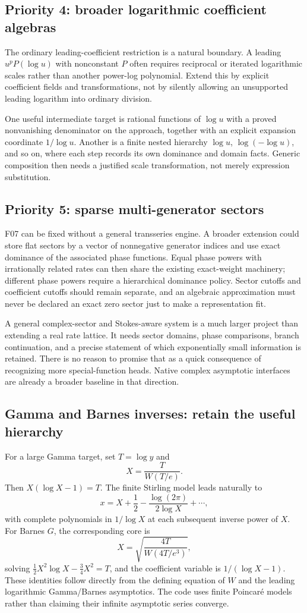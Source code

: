 \documentclass[11pt,letterpaper]{article}
\begin{document}
\subsection{Priority 4: broader logarithmic coefficient algebras}
The ordinary leading-coefficient restriction is a natural boundary. A leading $u^p P(\log u)$ with nonconstant $P$ often requires reciprocal or iterated logarithmic scales rather than another power-log polynomial. Extend this by explicit coefficient fields and transformations, not by silently allowing an unsupported leading logarithm into ordinary division.

One useful intermediate target is rational functions of $\log u$ with a proved nonvanishing denominator on the approach, together with an explicit expansion coordinate $1/\log u$. Another is a finite nested hierarchy $\log u$, $\log(-\log u)$, and so on, where each step records its own dominance and domain facts. Generic composition then needs a justified scale transformation, not merely expression substitution.

\subsection{Priority 5: sparse multi-generator sectors}
F07 can be fixed without a general transseries engine. A broader extension could store flat sectors by a vector of nonnegative generator indices and use exact dominance of the associated phase functions. Equal phase powers with irrationally related rates can then share the existing exact-weight machinery; different phase powers require a hierarchical dominance policy. Sector cutoffs and coefficient cutoffs should remain separate, and an algebraic approximation must never be declared an exact zero sector just to make a representation fit.

A general complex-sector and Stokes-aware system is a much larger project than extending a real rate lattice. It needs sector domains, phase comparisons, branch continuation, and a precise statement of which exponentially small information is retained. There is no reason to promise that as a quick consequence of recognizing more special-function heads. Native complex asymptotic interfaces are already a broader baseline in that direction.\cite{wl-asymptotic,wl-asymptoticsolve}

\subsection{Gamma and Barnes inverses: retain the useful hierarchy}
For a large Gamma target, set $T=\log y$ and
\[
 X=\frac{T}{W(T/e)}.
\]
Then $X(\log X-1)=T$. The finite Stirling model leads naturally to
\[
 x=X+\frac12-\frac{\log(2\pi)}{2\log X}+\cdots,
\]
with complete polynomials in $1/\log X$ at each subsequent inverse power of $X$. For Barnes $G$, the corresponding core is
\[
 X=\sqrt{\frac{4T}{W(4T/e^3)}},
\]
solving $\tfrac12X^2\log X-\tfrac34X^2=T$, and the coefficient variable is $1/(\log X-1)$. These identities follow directly from the defining equation of $W$ and the leading logarithmic Gamma/Barnes asymptotics. The code uses finite Poincar\'e models rather than claiming their infinite asymptotic series converge.\cite{repo-gamma,wl-productlog,dlmf-gamma,dlmf-barnes}
\end{document}
